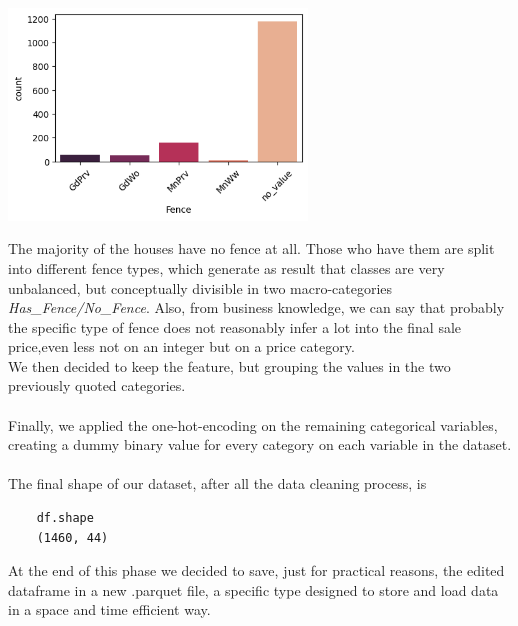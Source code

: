 \begin{center}
    \includegraphics*[width=300px]{imgs/Fence.png}
    \label{Fence distribution}
\end{center}
The majority of the houses have no fence at all. Those who have them are split into different fence types, which generate as result that classes are very unbalanced, but conceptually divisible in two macro-categories \emph{Has\_Fence/No\_Fence}.
Also, from business knowledge, we can say that probably the specific type of fence does not reasonably infer a lot into the final sale price,even less not on an integer but on a price category. \\
We then decided to keep the feature, but grouping the values in the two previously quoted categories.\\
\\Finally, we applied the one-hot-encoding on the remaining categorical variables, creating a dummy binary value for every category on each variable in the dataset.\\
\\The final shape of our dataset, after all the data cleaning process, is 
\begin{verbatim}
    df.shape
    (1460, 44)
\end{verbatim}
At the end of this phase we decided to save, just for practical reasons, the edited dataframe in a new .parquet file, a specific type designed to store and load data in a space and time efficient way.
